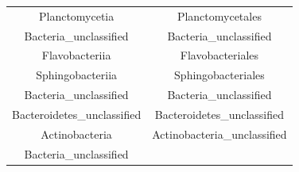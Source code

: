 \documentclass[]{article}
\begin{document}
\begin{longtable}[]{@{}cc@{}}
\begin{minipage}[t]{0.38\columnwidth}
Planctomycetia\strut
\end{minipage} & \begin{minipage}[t]{0.38\columnwidth}\centering\strut
Planctomycetales\strut
\end{minipage}\tabularnewline
\begin{minipage}[t]{0.38\columnwidth}\centering\strut
Bacteria\_unclassified\strut
\end{minipage} & \begin{minipage}[t]{0.38\columnwidth}\centering\strut
Bacteria\_unclassified\strut
\end{minipage}\tabularnewline
\begin{minipage}[t]{0.38\columnwidth}\centering\strut
Flavobacteriia\strut
\end{minipage} & \begin{minipage}[t]{0.38\columnwidth}\centering\strut
Flavobacteriales\strut
\end{minipage}\tabularnewline
\begin{minipage}[t]{0.38\columnwidth}\centering\strut
Sphingobacteriia\strut
\end{minipage} & \begin{minipage}[t]{0.38\columnwidth}\centering\strut
Sphingobacteriales\strut
\end{minipage}\tabularnewline
\begin{minipage}[t]{0.38\columnwidth}\centering\strut
Bacteria\_unclassified\strut
\end{minipage} & \begin{minipage}[t]{0.38\columnwidth}\centering\strut
Bacteria\_unclassified\strut
\end{minipage}\tabularnewline
\begin{minipage}[t]{0.38\columnwidth}\centering\strut
Bacteroidetes\_unclassified\strut
\end{minipage} & \begin{minipage}[t]{0.38\columnwidth}\centering\strut
Bacteroidetes\_unclassified\strut
\end{minipage}\tabularnewline
\begin{minipage}[t]{0.38\columnwidth}\centering\strut
Actinobacteria\strut
\end{minipage} & \begin{minipage}[t]{0.38\columnwidth}\centering\strut
Actinobacteria\_unclassified\strut
\end{minipage}\tabularnewline
\begin{minipage}[t]{0.38\columnwidth}\centering\strut
Bacteria\_unclassified\strut

\end{minipage}
\end{longtable}
\end{document}

